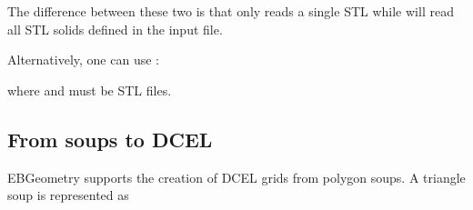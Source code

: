 \documentclass[letterpaper,10pt,english]{sphinxmanual}
\begin{document}
\sphinxAtStartPar
The difference between these two is that  only reads a single STL  while  will read all STL solids defined in the input file.

\sphinxAtStartPar
Alternatively, one can use :

\begin{sphinxVerbatim}[commandchars=\\\{\}]

\end{sphinxVerbatim}

\sphinxAtStartPar
where  and  must be STL files.


\subsection{From soups to DCEL}
\label{\detokenize{Parsers:from-soups-to-dcel}}\label{\detokenize{Parsers:chap-polysoups}}
\sphinxAtStartPar
EBGeometry supports the creation of DCEL grids from polygon soups.
A triangle soup is represented as
\end{document}
